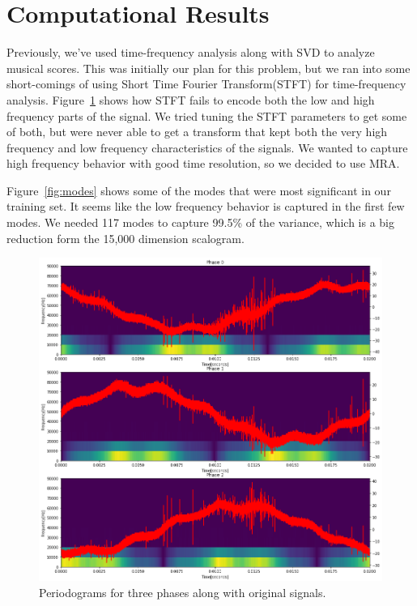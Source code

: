 \documentclass{article}
\begin{document}
\section{Computational Results}
Previously, we've used time-frequency analysis along with SVD to analyze musical
scores\cite{hw2}. This was initially our plan for this problem, but we ran into
some short-comings of using Short Time Fourier Transform(STFT) for
time-frequency analysis. Figure~\ref{fig:periodogram} shows how STFT fails to
encode both the low and high frequency parts of the signal. We tried tuning the
STFT parameters to get some of both, but were never able to get a transform that
kept both the very high frequency and low frequency characteristics of the
signals. We wanted to capture high frequency behavior with good time resolution,
so we decided to use MRA.

Figure~\ref{fig:modes} shows some of the modes that were most significant in our
training set. It seems like the low frequency behavior is captured in the first
few modes. We needed 117 modes to capture 99.5\% of the variance, which is a big
reduction form the 15,000 dimension scalogram.

\begin{figure}
    \centering
    \includegraphics[width=0.8\linewidth]{stft.png}
    \caption{Periodograms for three phases along with original signals.}
    \label{fig:periodogram}
\end{figure}
\end{document}

